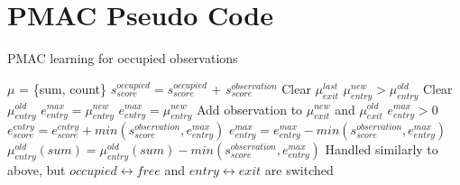 \chapter{PMAC Pseudo Code}
\label{appendix:pmac_pseudo_code}
\begin{algorithm}
	\caption{PMAC learning for occupied observations}
	\label{al:object_recognition}
	\begin{algorithmic}[1]
		\State $\mu$ = \{sum, count\}
		\State $s_{score}^{occupied} = s_{score}^{occupied}$ + $s_{score}^{observation}$
		\State Clear $\mu_{exit}^{last}$
		\If $\mu_{entry}^{new} > \mu_{entry}^{old}$ 
		\State Clear $\mu_{entry}^{old}$
		\State $e_{entry}^{max} = \mu_{entry}^{new}$
		\Else
		\State $e_{entry}^{max} = \mu_{entry}^{new}$
		\EndIf
		\EndIf
		\State Add observation to $\mu_{exit}^{new}$ and $\mu_{exit}^{old}$
		\If $e_{entry}^{max} > 0$
		\State $e_{score}^{entry} = e_{score}^{entry} + min(s_{score}^{observation},e_{entry}^{max})$
		\State $e_{entry}^{max} = e_{entry}^{max} - min(s_{score}^{observation},e_{entry}^{max})$
		\State $\mu_{entry}^{old}(sum) = \mu_{entry}^{old}(sum) - min(s_{score}^{observation},e_{entry}^{max})$
		\EndIf
		\EndIf
			\State Handled similarly to above, but $occupied \leftrightarrow free$ and $entry \leftrightarrow exit$ are switched
		\EndIf
		\EndFor
	\end{algorithmic}
\end{algorithm}
